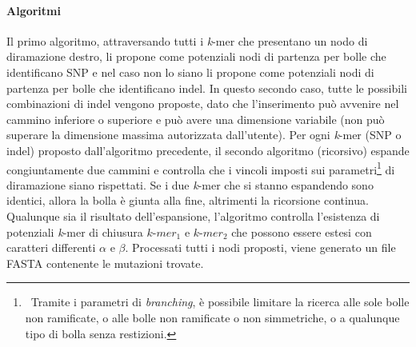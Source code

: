 \documentclass[../main.tex]{subfiles}
\begin{document}
\paragraph{Algoritmi} Il primo algoritmo, attraversando tutti i \textit{k}-mer che presentano un nodo di diramazione destro, li propone come potenziali nodi di partenza per bolle che identificano SNP e nel caso non lo siano li propone come potenziali nodi di partenza per bolle che identificano indel. In questo secondo caso, tutte le possibili combinazioni di indel vengono proposte, dato che l'inserimento può avvenire nel cammino inferiore o superiore e può avere una dimensione variabile (non può superare la dimensione massima autorizzata dall'utente). Per ogni \textit{k}-mer (SNP o indel) proposto dall'algoritmo precedente, il secondo algoritmo (ricorsivo) espande congiuntamente due cammini e controlla che i vincoli imposti sui parametri\footnote{\ Tramite i parametri di \textit{branching}, è possibile limitare la ricerca alle sole bolle non ramificate, o alle bolle non ramificate o non simmetriche, o a qualunque tipo di bolla senza restizioni.} di diramazione siano rispettati. Se i due \textit{k}-mer che si stanno espandendo sono identici, allora la bolla è giunta alla fine, altrimenti la ricorsione continua. Qualunque sia il risultato dell'espansione, l'algoritmo controlla l'esistenza di potenziali \textit{k}-mer di chiusura $k\texttt{-}mer_1$ e $k\texttt{-}mer_2$ che possono essere estesi con caratteri differenti $\alpha$ e $\beta$. Processati tutti i nodi proposti, viene generato un file FASTA contenente le mutazioni trovate.
\end{document}
